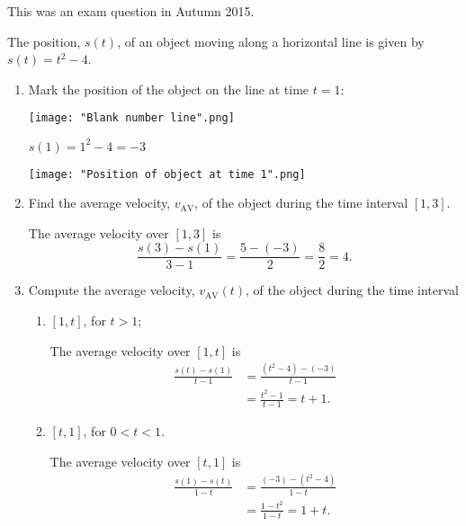 \documentclass[nooutcomes]{ximera}
\begin{document}
\begin{problem} This was an exam question in Autumn 2015.
			
 The position, $s(t)$, of an object moving along a horizontal line is given by $s(t) = t^2 - 4$.
  \begin{enumerate}
    \item
      Mark the position of the object on the line at time $t = 1$:
\begin{image}
        \texttt{[image: "Blank number line".png]}
      \end{image}      

	\begin{freeResponse}
	$s(1)=1^2-4=-3$
	
	\begin{image}
        \texttt{[image: "Position of object at time 1".png]}
      \end{image}
	\end{freeResponse}


    \item
      Find the average velocity, $v_{\mathrm{AV}}$, of the object during the time interval $[1, 3]$.
      \begin{freeResponse}
        The average velocity over $[1, 3]$ is
        \[
          \frac{s(3) - s(1)}{3-1}  = \frac{5 - (-3)}{2} = \frac{8}{2} = 4.
        \]
      \end{freeResponse}


    \item
      Compute the average velocity, $v_{\mathrm{AV}}(t)$, of the object during the time interval
      \begin{enumerate}
        \item
          $[1, t]$, for $t > 1$;
          \begin{freeResponse}
            The average velocity over $[1, t]$ is
            \begin{align*}
              \frac{s(t) - s(1)}{t-1}  &= \frac{(t^2-4) - (-3)}{t-1}\\
              &= \frac{t^2-1}{t-1} = t+1.
            \end{align*}
          \end{freeResponse}

        \item
          $[t, 1]$, for $0 < t < 1$.
          \begin{freeResponse}
            The average velocity over $[t, 1]$ is
            \begin{align*}
              \frac{s(1) - s(t)}{1-t}  &= \frac{(-3) - (t^2-4)}{1-t}\\
              &= \frac{1-t^2}{1-t} = 1+t.
            \end{align*}
          \end{freeResponse}
      \end{enumerate}


\end{enumerate}
\end{problem}
\end{document}
